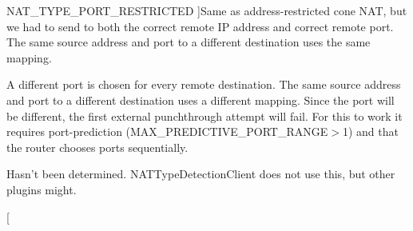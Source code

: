 \begin{Desc}
\begin{description}
{\hypertarget{namespace_rak_net_a81848fd95488939c0b3e217209f31139a535283d246a7f5e16837d39f7cc3a49a}{N\-A\-T\-\_\-\-T\-Y\-P\-E\-\_\-\-P\-O\-R\-T\-\_\-\-R\-E\-S\-T\-R\-I\-C\-T\-E\-D}\label{namespace_rak_net_a81848fd95488939c0b3e217209f31139a535283d246a7f5e16837d39f7cc3a49a}
}]Same as address-\/restricted cone N\-A\-T, but we had to send to both the correct remote I\-P address and correct remote port. The same source address and port to a different destination uses the same mapping. \item[{\em 
\hypertarget{namespace_rak_net_a81848fd95488939c0b3e217209f31139a0fe9820fcb6c01ea039c04165f8a38f8}{N\-A\-T\-\_\-\-T\-Y\-P\-E\-\_\-\-S\-Y\-M\-M\-E\-T\-R\-I\-C}\label{namespace_rak_net_a81848fd95488939c0b3e217209f31139a0fe9820fcb6c01ea039c04165f8a38f8}
}]A different port is chosen for every remote destination. The same source address and port to a different destination uses a different mapping. Since the port will be different, the first external punchthrough attempt will fail. For this to work it requires port-\/prediction (M\-A\-X\-\_\-\-P\-R\-E\-D\-I\-C\-T\-I\-V\-E\-\_\-\-P\-O\-R\-T\-\_\-\-R\-A\-N\-G\-E$>$1) and that the router chooses ports sequentially. \item[{\em 
\hypertarget{namespace_rak_net_a81848fd95488939c0b3e217209f31139a0f4cdc67acdc19e4287f0b44a0c91945}{N\-A\-T\-\_\-\-T\-Y\-P\-E\-\_\-\-U\-N\-K\-N\-O\-W\-N}\label{namespace_rak_net_a81848fd95488939c0b3e217209f31139a0f4cdc67acdc19e4287f0b44a0c91945}
}]Hasn't been determined. N\-A\-T\-Type\-Detection\-Client does not use this, but other plugins might. \item[{\em 
}
\end{description}
\end{Desc}
